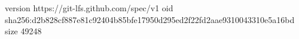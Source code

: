 version https://git-lfs.github.com/spec/v1
oid sha256:d2b828cf887e81c92404b85bfe17950d295ed2f22fd2aae9310043310e5a16bd
size 49248
